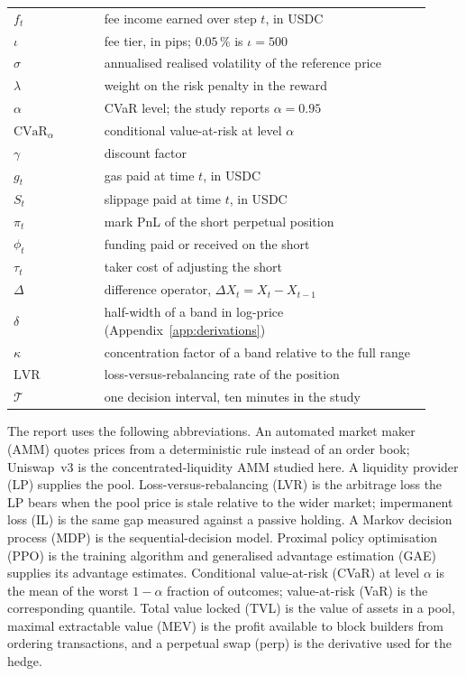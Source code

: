 \begin{table}[tbp]
\begin{tabular}{@{}L{0.20\linewidth}L{0.72\linewidth}@{}}
$f_t$ & fee income earned over step $t$, in USDC \\
$\iota$ & fee tier, in pips; $0.05\,\%$ is $\iota=500$ \\
$\sigma$ & annualised realised volatility of the reference price \\
$\lambda$ & weight on the risk penalty in the reward \\
$\alpha$ & CVaR level; the study reports $\alpha = 0.95$ \\
$\mathrm{CVaR}_\alpha$ & conditional value-at-risk at level $\alpha$ \\
$\gamma$ & discount factor \\
$g_t$ & gas paid at time $t$, in USDC \\
$S_t$ & slippage paid at time $t$, in USDC \\
$\pi_t$ & mark PnL of the short perpetual position \\
$\phi_t$ & funding paid or received on the short \\
$\tau_t$ & taker cost of adjusting the short \\
$\Delta$ & difference operator, $\Delta X_t = X_t - X_{t-1}$ \\
$\delta$ & half-width of a band in log-price (Appendix~\ref{app:derivations}) \\
$\kappa$ & concentration factor of a band relative to the full range \\
$\mathrm{LVR}$ & loss-versus-rebalancing rate of the position \\
$\mathcal{T}$ & one decision interval, ten minutes in the study \\
\bottomrule
\end{tabular}
\end{table}

The report uses the following abbreviations. An automated market maker (AMM)
quotes prices from a deterministic rule instead of an order book; Uniswap~v3
is the concentrated-liquidity AMM studied here\cite{adams2021uniswap}. A
liquidity provider (LP) supplies the pool. Loss-versus-rebalancing (LVR) is
the arbitrage loss the LP bears when the pool price is stale relative to the
wider market\cite{milionis2022lvr}; impermanent loss (IL) is the same gap
measured against a passive holding. A Markov decision process (MDP) is the
sequential-decision model. Proximal policy optimisation (PPO) is the training
algorithm\cite{schulman2017ppo} and generalised advantage estimation (GAE)
supplies its advantage estimates\cite{schulman2015gae}. Conditional
value-at-risk (CVaR) at level $\alpha$ is the mean of the worst
$1-\alpha$ fraction of outcomes; value-at-risk (VaR) is the corresponding
quantile\cite{rockafellar2000cvar}. Total value locked (TVL) is the value of
assets in a pool, maximal extractable value (MEV) is the profit available to
block builders from ordering transactions, and a perpetual swap (perp) is the
derivative used for the hedge.
